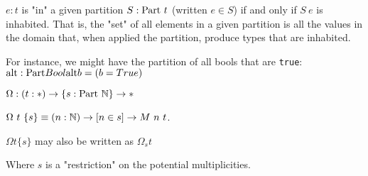 \begin{definition}
	$e : t$ is "in" a given partition $S : \tset \ t$ (written $e \in S$) if and only if $S \ e$ is inhabited.
	That is, the "set" of all elements in a given partition is all the values in the domain that, when applied the partition, produce types that are inhabited. 
\end{definition}

For instance, we might have the partition of all bools that are \verb|true|: 
\begin{math}
	\text{alt} : \text{Part} Bool 
	\text{alt} b = (b = True)
\end{math}

\begin{definition}
	$\Omega : (t : \tpe) \to \{s : \tset \ \nat\} \to \tpe $
	
	$\Omega \ t \ \{s\} \equiv (n : \mathbb{N}) \to [n \in s] \to M \ n \ t$.
	
	$\Omega t \{s\}$ may also be written as $\Omega_s t$
\end{definition}

Where $s$ is a "restriction" on the potential multiplicities.
